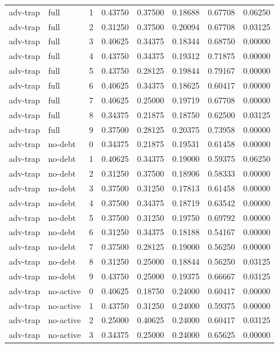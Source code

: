 \documentclass{article}
\begin{document}
\begin{center}
\begin{longtable}{llllllll}
adv-trap & full & 1 & 0.43750 & 0.37500 & 0.18688 & 0.67708 & 0.06250 \\
adv-trap & full & 2 & 0.31250 & 0.37500 & 0.20094 & 0.67708 & 0.03125 \\
adv-trap & full & 3 & 0.40625 & 0.34375 & 0.18344 & 0.68750 & 0.00000 \\
adv-trap & full & 4 & 0.43750 & 0.34375 & 0.19312 & 0.71875 & 0.00000 \\
adv-trap & full & 5 & 0.43750 & 0.28125 & 0.19844 & 0.79167 & 0.00000 \\
adv-trap & full & 6 & 0.40625 & 0.34375 & 0.18625 & 0.60417 & 0.00000 \\
adv-trap & full & 7 & 0.40625 & 0.25000 & 0.19719 & 0.67708 & 0.00000 \\
adv-trap & full & 8 & 0.34375 & 0.21875 & 0.18750 & 0.62500 & 0.03125 \\
adv-trap & full & 9 & 0.37500 & 0.28125 & 0.20375 & 0.73958 & 0.00000 \\
adv-trap & no-debt & 0 & 0.34375 & 0.21875 & 0.19531 & 0.61458 & 0.00000 \\
adv-trap & no-debt & 1 & 0.40625 & 0.34375 & 0.19000 & 0.59375 & 0.06250 \\
adv-trap & no-debt & 2 & 0.31250 & 0.37500 & 0.18906 & 0.58333 & 0.00000 \\
adv-trap & no-debt & 3 & 0.37500 & 0.31250 & 0.17813 & 0.61458 & 0.00000 \\
adv-trap & no-debt & 4 & 0.37500 & 0.34375 & 0.18719 & 0.63542 & 0.00000 \\
adv-trap & no-debt & 5 & 0.37500 & 0.31250 & 0.19750 & 0.69792 & 0.00000 \\
adv-trap & no-debt & 6 & 0.31250 & 0.34375 & 0.18188 & 0.54167 & 0.00000 \\
adv-trap & no-debt & 7 & 0.37500 & 0.28125 & 0.19000 & 0.56250 & 0.00000 \\
adv-trap & no-debt & 8 & 0.31250 & 0.25000 & 0.18844 & 0.56250 & 0.03125 \\
adv-trap & no-debt & 9 & 0.43750 & 0.25000 & 0.19375 & 0.66667 & 0.03125 \\
adv-trap & no-active & 0 & 0.40625 & 0.18750 & 0.24000 & 0.60417 & 0.00000 \\
adv-trap & no-active & 1 & 0.43750 & 0.31250 & 0.24000 & 0.59375 & 0.00000 \\
adv-trap & no-active & 2 & 0.25000 & 0.40625 & 0.24000 & 0.60417 & 0.03125 \\
adv-trap & no-active & 3 & 0.34375 & 0.25000 & 0.24000 & 0.65625 & 0.00000 \\

\end{longtable}
\end{center}
\end{document}
